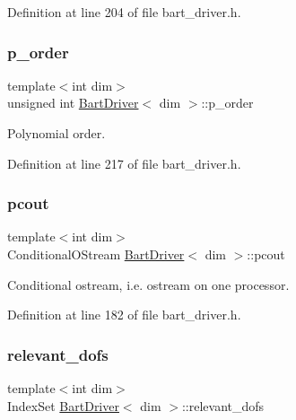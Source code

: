 Definition at line 204 of file bart\+\_\+driver.\+h.

\mbox{\label{class_bart_driver_ae6d782d30c28d741bb0df46251087809}} 
\subsubsection{\texorpdfstring{p\+\_\+order}{p\_order}}
{\footnotesize\ttfamily template$<$int dim$>$ \\
unsigned int \hyperlink{class_bart_driver}{Bart\+Driver}$<$ dim $>$\+::p\+\_\+order\hspace{0.3cm}{\ttfamily [private]}}



Polynomial order. 



Definition at line 217 of file bart\+\_\+driver.\+h.

\mbox{\label{class_bart_driver_ad7bd8e33b7a6e67aa3d31527e40d18ea}} 
\subsubsection{\texorpdfstring{pcout}{pcout}}
{\footnotesize\ttfamily template$<$int dim$>$ \\
Conditional\+O\+Stream \hyperlink{class_bart_driver}{Bart\+Driver}$<$ dim $>$\+::pcout\hspace{0.3cm}{\ttfamily [private]}}



Conditional ostream, i.\+e. ostream on one processor. 



Definition at line 182 of file bart\+\_\+driver.\+h.

\mbox{\label{class_bart_driver_aabb9851e7b41f4a4b9395d79e4653ec7}} 
\subsubsection{\texorpdfstring{relevant\+\_\+dofs}{relevant\_dofs}}
{\footnotesize\ttfamily template$<$int dim$>$ \\
Index\+Set \hyperlink{class_bart_driver}{Bart\+Driver}$<$ dim $>$\+::relevant\+\_\+dofs\hspace{0.3cm}{\ttfamily [private]}}



